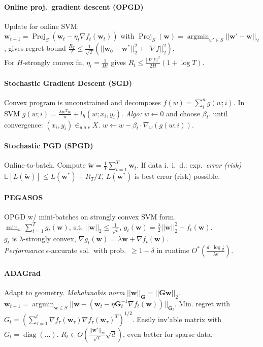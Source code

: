 \documentclass[10pt]{scrartcl}
\DeclareMathOperator{\diag}{diag}
\DeclareMathOperator{\argmin}{argmin}
\DeclareMathOperator{\Proj}{Proj}
\newcommand{\eps}{\epsilon}
\newcommand{\E}{\mathbb{E}}
\begin{document}
\begin{multicols}{3}
\paragraph{Online proj.\ gradient descent (OPGD)}
Update for online SVM: \\
$\bm w_{t+1} = \Proj_S(\bm w_t-\eta_t\nabla f_t(\bm w_t))$ with $\Proj_S(\bm w) = \argmin_{w'\in S} ||\bm w'-\bm w||_2$, gives regret bound $\frac{R_T}{T}\leq\frac{1}{\sqrt{T}}(||\bm w_0-\bm w^*||_2^2+||\nabla f||_2^2)$. \\
For $H$-strongly convex fn, $\eta_t = \frac{1}{Ht}$ gives $R_t \leq \frac{||\nabla f||^2}{2H}(1+\log T)$.

\paragraph{Stochastic Gradient Descent (SGD)}
Convex program is unconstrained and decomposes $f(w)=\sum_{i}^n{g(w; i)}$. In SVM $g(w; i) = \frac{\lambda w^Tw}{n} + l_h(w; x_i, y_i)$. \emph{Algo:} $w \leftarrow 0$ and choose $\beta_t$. until convergence: $(x_i,y_i)\in_{u.a.r}X$. $w\leftarrow w - \beta_t \cdot \nabla_w(g(w; i))$.

\paragraph{Stochastic PGD (SPGD)}
Online-to-batch. Compute $\tilde{\bm w} = \frac{1}{T}\sum_{t=1}^{T} \bm w_t$.
If data i.\ i.\ d.: exp.\ \emph{error (risk)} $\E[L(\tilde{\bm w})] \leq L(\bm w^*) + R_T/T$, $L(\bm w^*)$ is best error (risk) possible.

\paragraph{PEGASOS}
OPGD w/ mini-batches on strongly convex SVM form. \\
$\min_w \sum_{t=1}^{T} g_t(\bm w)$, s.t. $||\bm w||_2 \leq \frac{1}{\sqrt t}$, $g_t(\bm w) = \frac{\lambda}{2}||\bm w||_2^2 + f_t(\bm w)$. \\
$g_t$ is $\lambda$-strongly convex, $\nabla g_t(\bm w) = \lambda \bm w + \nabla f_t(\bm w)$. \\
\emph{Performance} $\eps$-accurate sol.\ with prob.\ $\geq 1-\delta$ in runtime $O^*(\frac{d\cdot\log\frac{1}{\delta}}{\lambda\eps}).$

\paragraph{ADAGrad}
Adapt to geometry.
\emph{Mahalanobis norm} $||\bm w||_{\bm G} = ||\bm G\bm w||_2$. \\
$\bm w_{t+1}=\argmin_{\bm w\in S}||\bm w - (\bm w_t - \eta \bm G_t^{-1}\nabla f_t(\bm w))||_{\bm G_t}$.
Min. regret with $G_t = (\sum_{\tau = 1}^{t} \nabla f_\tau(\bm w_\tau)\nabla f_\tau(\bm w_\tau)^T)^{1/2}.$
Easily inv'able matrix with $G_t = \diag(\dots).$
$R_t \in O(\frac{||\bm w^*||_\infty}{\sqrt T}\sqrt d)$, even better for sparse data.


\end{multicols}
\end{document}
